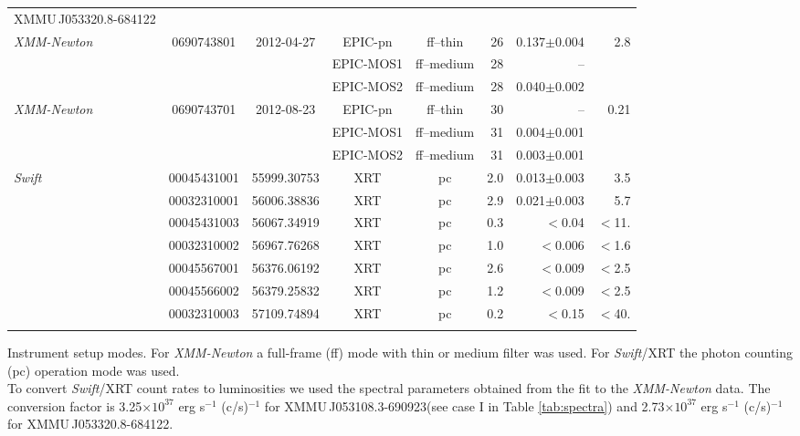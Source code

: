 \documentclass[a4paper,fleqn,usenatbib]{mnras}
\newcommand{\swift}{{\it Swift}\xspace}
\newcommand{\xmm}{{\it XMM-Newton}\xspace}
\newcommand{\canda}{XMMU\,J053108.3-690923\xspace} %
\newcommand{\candb}{XMMU\,J053320.8-684122\xspace} %
\begin{document}
\begin{table*}
\begin{center}
{\begin{threeparttable}
\begin{tabular}{lccccrrr}
\hline\noalign{\smallskip}
\candb \\
\xmm     & 0690743801  &  2012-04-27    &  EPIC-pn    &  ff--thin   &  26  & 0.137$\pm$0.004  & 2.8\\
         &             &                &  EPIC-MOS1  &  ff--medium &  28  & --  & \\
         &             &                &  EPIC-MOS2  &  ff--medium &  28  &  0.040$\pm$0.002 & \\         
\xmm     & 0690743701  &  2012-08-23    &  EPIC-pn    &  ff--thin   &  30  &  -- & 0.21\\
         &             &                &  EPIC-MOS1  &  ff--medium &  31  &   0.004$\pm$0.001 & \\
         &             &                &  EPIC-MOS2  &  ff--medium &  31  &  0.003$\pm$0.001 & \\
\swift   & 00045431001 & 55999.30753    &  XRT        &  pc         &  2.0 & 0.013$\pm$0.003 & 3.5\\
         & 00032310001 & 56006.38836    &  XRT        &  pc         &  2.9 & 0.021$\pm$0.003 & 5.7\\
         & 00045431003 & 56067.34919    &  XRT        &  pc         &  0.3 & $<$0.04 & $<$11.\\
         & 00032310002 & 56967.76268    &  XRT        &  pc         &  1.0 & $<$0.006 & $<$1.6\\
         & 00045567001 & 56376.06192    &  XRT        &  pc         &  2.6 & $<$0.009 & $<$2.5\\
         & 00045566002 & 56379.25832    &  XRT        &  pc         &  1.2 & $<$0.009 & $<$2.5\\
         & 00032310003 & 57109.74894    &  XRT        &  pc         &  0.2 & $<$0.15 & $<$40.\\

\hline\noalign{\smallskip}
\end{tabular}
 Instrument setup modes. For \xmm a full-frame (ff) mode with thin or medium filter was used. For \swift/XRT the photon counting (pc) operation mode was used.   \\
 To convert \swift/XRT count rates to luminosities we used the spectral parameters obtained from the fit to the \xmm data. The conversion factor is 3.25$\times 10^{37}$ erg s$^{-1}$ (c/s)$^{-1}$ for \canda (see case I in Table \ref{tab:spectra}) and 2.73$\times 10^{37}$ erg s$^{-1}$ (c/s)$^{-1}$ for \candb.\\
\end{threeparttable}
 }
\end{center}
\label{tab:log}
\end{table*}
\end{document}
